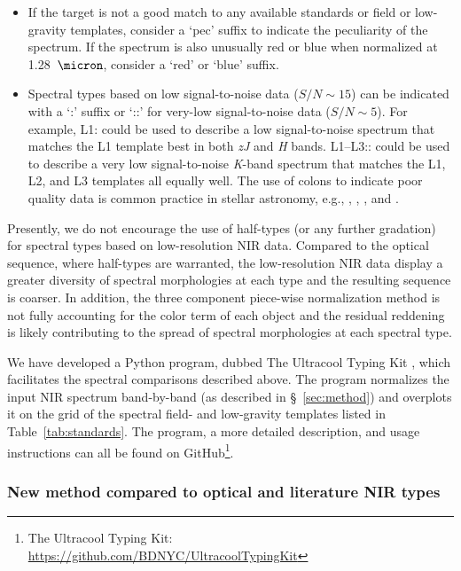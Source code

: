 \documentclass[modern]{aastex61}
\begin{document}
\begin{itemize}
	\item If the target is not a good match to any available standards or field or low-gravity templates, consider a `pec' suffix to indicate the peculiarity of the spectrum. If the spectrum is also unusually red or blue when normalized at 1.28~$\micron$, consider a `red' or `blue' suffix.
	\item Spectral types based on low signal-to-noise data ($S/N\sim15$) can be indicated with a `:' suffix or `::' for very-low signal-to-noise data ($S/N\sim5$).
    For example, L1: could be used to describe a low signal-to-noise spectrum that matches the L1 template best in both \emph{zJ} and \emph{H} bands. L1--L3:: could be used to describe a very low signal-to-noise \emph{K}-band spectrum that matches the L1, L2, and L3 templates all equally well.
	The use of colons to indicate poor quality data is common practice in stellar astronomy, e.g., \citet{Sanduleak:1988fn}, \cite{Silvestri:2006el}, \citet[Table 12.1]{Gray:2009wd}, and \cite{Covey:2010de}.

\end{itemize}

Presently, we do not encourage the use of half-types (or any further gradation) for spectral types based on low-resolution NIR data.
Compared to the optical sequence, where half-types are warranted, the low-resolution NIR data display a greater diversity of spectral morphologies at each type and the resulting sequence is coarser.
In addition, the three component piece-wise normalization method is not fully accounting for the color term of each object and the residual reddening is likely contributing to the spread of spectral morphologies at each spectral type.

We have developed a Python program, dubbed The Ultracool Typing Kit \citep{Abrahams:2017ex}, which facilitates the spectral comparisons described above.
The program normalizes the input NIR spectrum band-by-band (as described in \S~\ref{sec:method}) and overplots it on the grid of the spectral field- and low-gravity templates listed in Table~\ref{tab:standards}.
The program, a more detailed description, and usage instructions can all be found on GitHub\footnote{The Ultracool Typing Kit: \url{https://github.com/BDNYC/UltracoolTypingKit}}.

\subsubsection{New method compared to optical and literature NIR types}
\end{document}
